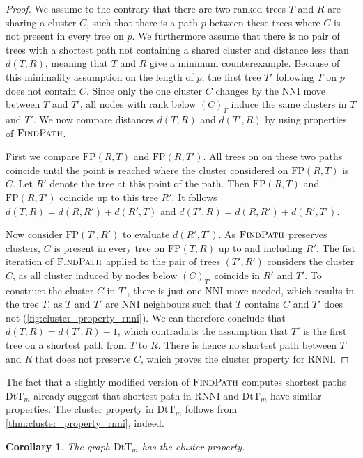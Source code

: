 \documentclass[11pt]{amsart}
\newtheorem{corollary}{Corollary}
\newcommand{\rnni}{\mathrm{RNNI}}
\newcommand{\findpath}{\textsc{FindPath}}
\newcommand{\nni}{\mathrm{NNI}}
\newcommand{\fp}{\mathrm{FP}}
\newcommand{\dtt}{\mathrm{DtT}}
\begin{document}
\begin{proof}
	We assume to the contrary that there are two ranked trees $T$ and $R$ are sharing a cluster $C$, such that there is a path $p$ between these trees where $C$ is not present in every tree on $p$.
	We furthermore assume that there is no pair of trees with a shortest path not containing a shared cluster and distance less than $d(T,R)$, meaning that $T$ and $R$ give a minimum counterexample.
	Because of this minimality assumption on the length of $p$, the first tree $T'$ following $T$ on $p$ does not contain $C$.
	Since only the one cluster $C$ changes by the $\nni$ move between $T$ and $T'$, all nodes with rank below $(C)_T$ induce the same clusters in $T$ and $T'$.
	We now compare distances $d(T,R)$ and $d(T',R)$ by using properties of $\findpath$.

	First we compare $\fp(R,T)$ and $\fp(R,T')$.
	All trees on on these two paths coincide until the point is reached where the cluster considered on $\fp(R,T)$ is $C$.
	Let $R'$ denote the tree at this point of the path.
	Then $\fp(R,T)$ and $\fp(R,T')$ coincide up to this tree $R'$.
	It follows $d(T,R) = d(R,R') + d(R', T)$ and $d(T',R) = d(R,R') + d(R', T')$.

	Now consider $\fp(T', R')$ to evaluate $d(R', T')$.
	As $\findpath$ preserves clusters, $C$ is present in every tree on $\fp(T,R)$ up to and including $R'$.
	The fist iteration of $\findpath$ applied to the pair of trees $(T',R')$ considers the cluster $C$, as all cluster induced by nodes below $(C)_{T'}$ coincide in $R'$ and $T'$.
	To construct the cluster $C$ in $T'$, there is just one $\nni$ move needed, which results in the tree $T$, as $T$ and $T'$ are $\nni$ neighbours such that $T$ contains $C$ and $T'$ does not (\autoref{fig:cluster_property_rnni}).
	We can therefore conclude that $d(T,R) = d(T',R) - 1$, which contradicts the assumption that $T'$ is the first tree on a shortest path from $T$ to $R$.
	There is hence no shortest path between $T$ and $R$ that does not preserve $C$, which proves the cluster property for $\rnni$.
\end{proof}

The fact that a slightly modified version of $\findpath$ computes shortest paths $\dtt_m$ already suggest that shortest path in $\rnni$ and $\dtt_m$ have similar properties.
The cluster property in $\dtt_m$ follows from \autoref{thm:cluster_property_rnni}, indeed.

\begin{corollary}
	The graph $\dtt_m$ has the cluster property.
\end{corollary}
\end{document}
